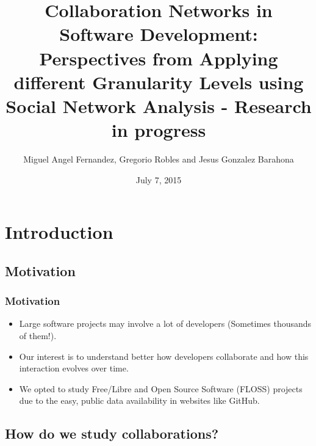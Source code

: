 \documentclass{beamer}
\title[SATToSE 2015]{Collaboration Networks in Software Development: Perspectives from Applying different Granularity Levels using Social Network Analysis - Research in progress} %
\author{Miguel Angel Fernandez, Gregorio Robles and Jesus Gonzalez Barahona} %
\institute[UCLA] %
{
GSyC/LibreSoft, Rey Juan Carlos University \\ %
\medskip
\textit{(ma.fernandezsa@alumnos, grex@)urjc.es; jgb@bitergia.com} %
}
\date{July 7, 2015} %
\begin{document}
\begin{frame}
\titlepage %
\end{frame}


\section{Introduction} %

\subsection{Motivation} %

\begin{frame}
\frametitle{Motivation}
\begin{itemize}
\item Large software projects may involve a lot of developers (Sometimes thousands of them!).
\item Our interest is to understand better how developers collaborate and how this interaction evolves over time.
\item We opted to study Free/Libre and Open Source Software (FLOSS) projects due to the easy, public data availability in websites like GitHub.

\end{itemize}
\end{frame}


\subsection{How do we study collaborations?}
\end{document}
